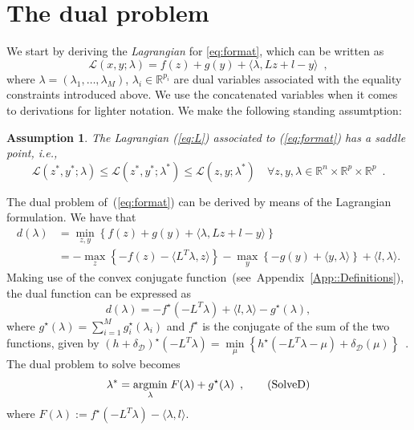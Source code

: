 \documentclass[openany]{now}
\newcommand{\ie}{{\it i.e.}}
\newcommand{\ones}{{\mathbf 1}}
\newcommand{\reals}{{\mathbb R}}
\newcommand{\argmin}{\mathop{\rm argmin}}
\newtheorem{myas}{Assumption}
\begin{document}
\section{The dual problem}
 We start by deriving the \emph{Lagrangian} for \eqref{eq:format}, which can be written as
\begin{equation}\label{eq:L}
\mathcal{L}(x,y;\lambda) = f(z)+ g(y) + \langle \lambda,  L z + l - y\rangle \enspace, \tag{L} 
\end{equation}
where $\lambda=(\lambda_1,\ldots,\lambda_M)$, $\lambda_i\in\reals^{p_i}$ are dual variables associated with the equality constraints introduced above.
We use the concatenated variables when it comes to derivations for lighter notation.
We make the following standing assumtption:
\begin{myas}\label{as:basic}
The Lagrangian (\ref{eq:L}) associated to (\ref{eq:format}) has a saddle point, \ie, 
\[
\mathcal{L}(z^\ast,y^\ast;\lambda) \le \mathcal{L}(z^\ast,y^\ast;\lambda^\ast) \le \mathcal{L}(z,y;\lambda^\ast) \quad \forall z,y,\lambda \in \reals^n\times\reals^p\times\reals^p\enspace.
\]
\end{myas}

The dual problem of~(\ref{eq:format}) can be derived by means of the Lagrangian formulation. We have that
\begin{align*}
 d(\lambda) &= \underset{z,y}{\min}\left\{f(z)+ g(y) + \langle \lambda,  L z + l - y\rangle \right\} \\
            &= -\underset{z}{\max}\left\{ -f(z) - \langle L^T\lambda, z\rangle  \right\}
  -\underset{y}{\max} \left\{ -g(y) + \langle  y,\lambda\rangle \right\} + \langle  l,\lambda\rangle .
\end{align*}
Making use of the convex conjugate function~(see~Appendix~\ref{App::Definitions}), the dual function can be expressed as
\begin{equation}
\label{eq:dual}
d(\lambda) = -f^\star(-L^T\lambda) + \langle  l,\lambda\rangle  - g^\star(\lambda), \tag{D}
\end{equation}
where $g^\star(\lambda)=\sum\limits_{i=1}^M g_i^\star(\lambda_i)$ and $f^\star$ is the conjugate of the sum of the two functions, given by $(h+\delta_\mathcal{D})^\star(-L^T\lambda)=\underset{\mu}{\min}\left\{h^\star(-L^T\lambda-\mu)+\delta_\mathcal{D}(\mu)\right\}$~\cite[Proposition~15.2]{bauschke2011convex}. The dual problem to solve becomes
\begin{equation}   
\label{eq:solve_dual}
  \lambda^\ast = \underset{\lambda}{\argmin}\; F(\lambda)  + g^\star(\lambda)\enspace, \tag{SolveD} 
\end{equation}
where $F(\lambda):=f^\star(-L^T\lambda) - \langle  \lambda,l\rangle $.
\end{document}
